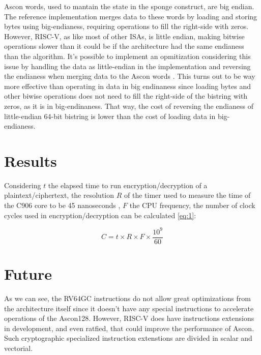 \documentclass[11pt,twoside]{article}
\begin{document}
Ascon words, used to mantain the state in the sponge construct, are big endian. The reference implementation merges data to these words by loading and storing bytes using big-endianess, requiring operations to fill the right-side with zeros. However, RISC-V, as like most of other ISAs, is little endian, making bitwise operations slower than it could be if the architecture had the same endianess than the algorithm. It's possible to implement an opmitization considering this issue by handling the data as little-endian in the implementation and reversing the endianess when merging data to the Ascon words \cite{jellema2019optimizing}. This turns out to be way more effective than operating in data in big endinaness since loading bytes and other biwise operations does not need to fill the right-side of the bistring with zeros, as it is in big-endinaness. That way, the cost of reversing the endianess of little-endian 64-bit bistring is lower than the cost of loading data in big-endianess.

\section{Results}

Considering $t$ the elapsed time to run encryption/decryption of a plaintext/ciphertext, the resolution $R$ of the timer used to measure the time of the C906 core to be 45 nanoseconds  \cite{10179399}, $F$ the CPU frequency, the number of clock cycles used in encryption/decryption can be calculated \cref{eq:1}:

\begin{equation}
  C = t \times R \times F \times \frac{10^{9}}{60} \label{eq:1}
\end{equation}

\section{Future}
As we can see, the RV64GC instructions do not allow great optimizations from the architecture itself since it doesn't have any special instructions to accelerate operations of the Ascon128. However, RISC-V does have instructions extensions in development, and even ratfied, that could improve the performance of Ascon. Such cryptographic specialized instruction extenstions are divided in scalar and vectorial.
\end{document}
